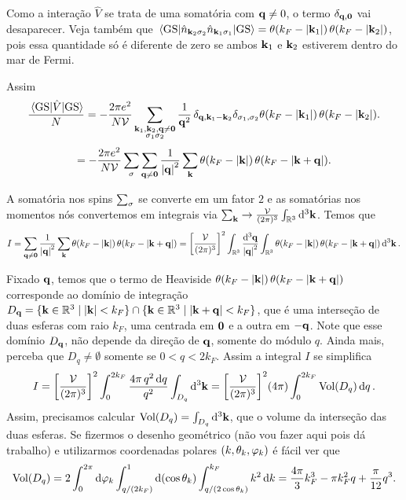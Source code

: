\documentclass[a4paper,10pt]{article}
\begin{document}
Como a interação $\hat{V}$ se trata de uma somatória com $\vb{q} \neq 0$, o termo $\delta_{\vb{q}, \vb{0}}$ vai desaparecer. Veja também que $\ev{\nn_{\k_2 \s_2} \nn_{\k_1 \s_1}}{\text{GS}} = \theta(k_F - \abs{\k_1}) \, \theta(k_F - \abs{\k_2})$, pois essa quantidade só é diferente de zero se ambos $\vb{k}_1$ e $\vb{k}_2$ estiverem dentro do mar de Fermi.

Assim
$$
\frac{\ev{\hat{V}}{\text{GS}}}{N} =
- \frac{2 \pi e^2}{N \mathcal{V}} \sum_{\substack{\k_1, \k_2, \q \neq \0 \\ \s_1 \s_2}}
\frac{1}{\q^2} \,
\delta_{\q, \k_1 - \k_2} \delta_{\s_1, \s_2} \theta(k_F - \abs{\k_1}) \, \theta(k_F - \abs{\k_2}).
$$
$$
= - \frac{2 \pi e^2}{N \mathcal{V}} \sum_{\sigma} \sum_{\vb{q} \neq \vb{0}} \frac{1}{\abs{\vb{q}}^2} \sum_{\vb{k}}
\theta(k_F - \abs{\vb{k}}) \, \theta(k_F - \abs{\vb{k} + \vb{q}}).
$$

A somatória nos spins $\sum_{\sigma}$ se converte em um fator $2$ e as somatórias nos momentos nós convertemos em integrais via $\sum_{\vb{k}} \to \frac{\mathcal{V}}{(2\pi)^3} \int_{\mathbb{R}^3} \dd[3]{\vb{k}}$. Temos que
$$
I = \sum_{\vb{q} \neq \vb{0}} \frac{1}{\abs{\vb{q}}^2} \sum_{\vb{k}}
\theta(k_F - \abs{\vb{k}}) \, \theta(k_F - \abs{\vb{k} + \vb{q}}) =
\qty[ \frac{\mathcal{V}}{(2\pi)^3} ]^2 \int_{\mathbb{R}^3} \frac{\dd[3]{\vb{q}}}{\abs{\vb{q}}^2} \int_{\mathbb{R}^3}
\theta(k_F - \abs{\vb{k}}) \, \theta(k_F - \abs{\vb{k} + \vb{q}}) \dd[3]{\vb{k}}.
$$

Fixado $\vb{q}$, temos que o termo de Heaviside $\theta(k_F - \abs{\vb{k}}) \, \theta(k_F - \abs{\vb{k} + \vb{q}})$ corresponde ao domínio de integração $D_{\vb{q}} = \{\vb{k} \in \mathbb{R}^3 \mid \abs{\vb{k}} < k_F\} \cap \{\vb{k} \in \mathbb{R}^3 \mid \abs{\vb{k} + \vb{q}} < k_F\}$, que é uma interseção de duas esferas com raio $k_F$, uma centrada em $\vb{0}$ e a outra em $-\vb{q}$. Note que esse domínio $D_{\vb{q}}$, não depende da direção de $\vb{q}$, somente do módulo $q$. Ainda mais, perceba que $D_q \neq \emptyset$ somente se $0 < q < 2 k_F$. Assim a integral $I$ se simplifica
$$
I = \qty[\frac{\mathcal{V}}{(2\pi)^3}]^2 \int_0^{2k_F} \frac{4\pi \, q^2 \dd{q}}{q^2} \int_{D_q} \dd[3]{\vb{k}} =
\qty[\frac{\mathcal{V}}{(2\pi)^3}]^2 (4\pi) \int_0^{2k_F} \text{Vol}(D_q) \dd{q}.
$$
Assim, precisamos calcular $\text{Vol}(D_q) = \int_{D_q} \dd[3]{\vb{k}}$, que o volume da interseção das duas esferas. Se fizermos o desenho geométrico (não vou fazer aqui pois dá trabalho) e utilizarmos coordenadas polares $(k, \theta_k, \varphi_k)$ é fácil ver que
$$
\text{Vol}(D_q) = 2 \int_0^{2\pi} \dd{\varphi_k} \int_{q / (2 k_F)}^{1} \dd(\cos\theta_k) \int_{q / (2 \cos\theta_k)}^{k_F} k^2 \dd{k} = \frac{4\pi}{3} k_F^3 - \pi k_F^2 q + \frac{\pi}{12} q^3.
$$
\end{document}
